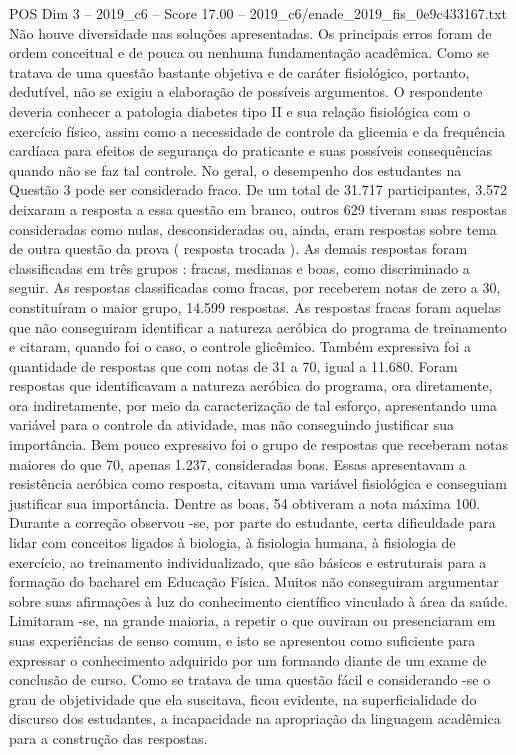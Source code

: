 \begin{textsample}{POS Dim 3 – 2019\_c6 – Score 17.00 – 2019\_c6/enade\_2019\_fis\_0e9c433167.txt}
Não houve diversidade nas soluções apresentadas.
Os principais erros foram de ordem conceitual e de pouca ou nenhuma fundamentação acadêmica.
Como se tratava de uma questão bastante objetiva e de caráter fisiológico, portanto, dedutível, não se exigiu a elaboração de possíveis argumentos.
O respondente deveria conhecer a patologia diabetes tipo II e sua relação fisiológica com o exercício físico, assim como a necessidade de controle da glicemia e da frequência cardíaca para efeitos de segurança do praticante e suas possíveis consequências quando não se faz tal controle.
No geral, o desempenho dos estudantes na Questão 3 pode ser considerado fraco.
De um total de 31.717 participantes, 3.572 deixaram a resposta a essa questão em branco, outros 629 tiveram suas respostas consideradas como nulas, desconsideradas ou, ainda, eram respostas sobre tema de outra questão da prova ( resposta trocada ).
As demais respostas foram classificadas em três grupos : fracas, medianas e boas, como discriminado a seguir.
As respostas classificadas como fracas, por receberem notas de zero a 30, constituíram o maior grupo, 14.599 respostas.
As respostas fracas foram aquelas que não conseguiram identificar a natureza aeróbica do programa de treinamento e citaram, quando foi o caso, o controle glicêmico.
Também expressiva foi a quantidade de respostas que com notas de 31 a 70, igual a 11.680.
Foram respostas que identificavam a natureza aeróbica do programa, ora diretamente, ora indiretamente, por meio da caracterização de tal esforço, apresentando uma variável para o controle da atividade, mas não conseguindo justificar sua importância.
Bem pouco expressivo foi o grupo de respostas que receberam notas maiores do que 70, apenas 1.237, consideradas boas.
Essas apresentavam a resistência aeróbica como resposta, citavam uma variável fisiológica e conseguiam justificar sua importância.
Dentre as boas, 54 obtiveram a nota máxima 100.
Durante a correção observou -se, por parte do estudante, certa dificuldade para lidar com conceitos ligados à biologia, à fisiologia humana, à fisiologia de exercício, ao treinamento individualizado, que são básicos e estruturais para a formação do bacharel em Educação Física.
Muitos não conseguiram argumentar sobre suas afirmações à luz do conhecimento científico vinculado à área da saúde.
Limitaram -se, na grande maioria, a repetir o que ouviram ou presenciaram em suas experiências de senso comum, e isto se apresentou como suficiente para expressar o conhecimento adquirido por um formando diante de um exame de conclusão de curso.
Como se tratava de uma questão fácil e considerando -se o grau de objetividade que ela suscitava, ficou evidente, na superficialidade do discurso dos estudantes, a incapacidade na apropriação da linguagem acadêmica para a construção das respostas.

\end{textsample}
